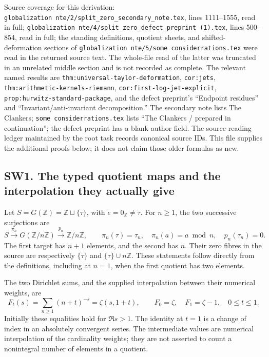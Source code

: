 \documentclass[
  10pt,
  a4paper,
]{article}
\begin{document}
Source coverage for this derivation:
\texttt{globalization\ nte/\allowbreak{}2/\allowbreak{}split\_\allowbreak{}zero\_\allowbreak{}secondary\_\allowbreak{}note.\allowbreak{}tex}, lines
1111--1555, read in full;
\texttt{globalization\ nte/\allowbreak{}4/\allowbreak{}split\_\allowbreak{}zero\_\allowbreak{}defect\_\allowbreak{}preprint\ (1).\allowbreak{}tex},
lines 500--854, read in full; the standing definitions, quotient sheets,
and shifted-deformation sections of
\texttt{globalization\ nte/\allowbreak{}5/\allowbreak{}some\ considerrations.\allowbreak{}tex} were read in the
returned source text. The whole-file read of the latter was truncated in
an unrelated middle section and is not recorded as complete. The
relevant named results are \texttt{thm:\allowbreak{}universal-\allowbreak{}taylor-\allowbreak{}deformation},
\texttt{cor:\allowbreak{}jets}, \texttt{thm:\allowbreak{}arithmetic-\allowbreak{}kernels-\allowbreak{}riemann},
\texttt{cor:\allowbreak{}first-\allowbreak{}log-\allowbreak{}jet-\allowbreak{}explicit},
\texttt{prop:\allowbreak{}hurwitz-\allowbreak{}standard-\allowbreak{}package}, and the defect preprint's
``Endpoint residues'' and ``Invariant/anti-invariant decomposition.''
The secondary note lists The Clankers;
\texttt{some\ considerrations.\allowbreak{}tex} lists ``The Clankers / prepared in
continuation''; the defect preprint has a blank author field. The
source-reading ledger maintained by the root task records canonical
source IDs. This file supplies the additional proofs below; it does not
claim those older formulas as new.

\subsection{SW1. The typed quotient maps and the interpolation they
actually
give}\label{sw1.-the-typed-quotient-maps-and-the-interpolation-they-actually-give}

Let \(S=G(\mathbb Z)=\mathbb Z\sqcup\{\tau\}\), with
\(e=0_{\mathbb Z}\ne\tau\). For \(n\ge1\), the two successive
surjections are \[
S\xrightarrow{\pi_n}G(\mathbb Z/n\mathbb Z)
\xrightarrow{p_n}\mathbb Z/n\mathbb Z,
\qquad
\pi_n(\tau)=\tau_n,\quad \pi_n(a)=a\bmod n,
\quad p_n(\tau_n)=0.
\tag{SW1}
\] The first target has \(n+1\) elements, and the second has \(n\).
Their zero fibres in the source are respectively \(\{\tau\}\) and
\(\{\tau\}\cup n\mathbb Z\). These statements follow directly from the
definitions, including at \(n=1\), when the first quotient has two
elements.

The two Dirichlet sums, and the supplied interpolation between their
numerical weights, are \[
F_t(s)=\sum_{n\ge1}(n+t)^{-s}=\zeta(s,1+t),\qquad
F_0=\zeta,\quad F_1=\zeta-1,
\quad 0\le t\le1.
\tag{SW2}
\] Initially these equalities hold for \(\Re s>1\). The identity at
\(t=1\) is a change of index in an absolutely convergent series. The
intermediate values are numerical interpolation of the cardinality
weights; they are not asserted to count a nonintegral number of elements
in a quotient.
\end{document}
